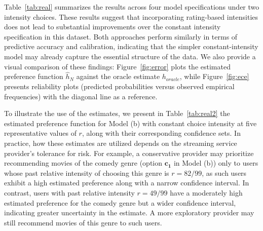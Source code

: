 \documentclass[12pt]{amsart}
\theoremstyle{plain}
\theoremstyle{remark}
\numberwithin{equation}{section}
\begin{document}
Table~\ref{tab:real} summarizes the results across four model specifications under two intensity choices. These results suggest that incorporating rating-based intensities does not lead to substantial improvements over the constant intensity specification in this dataset. Both approaches perform similarly in terms of predictive accuracy and calibration, indicating that the simpler constant-intensity model may already capture the essential structure of the data. We also provide a visual comparison of these findings: Figure~\ref{fig:error} plots the estimated preference function $\hat{h}_N$ against the oracle estimate $h_{oracle}$, while Figure~\ref{fig:ece} presents reliability plots (predicted probabilities versus observed empirical frequencies) with the diagonal line as a reference.

To illustrate the use of the estimates, we present in Table~\ref{tab:real2} the estimated preference function for Model (b) with constant choice intensity at five representative values of $r$, along with their corresponding confidence sets. In practice, how these estimates are utilized depends on the streaming service provider’s tolerance for risk. For example, a conservative provider may prioritize recommending movies of the comedy genre (option $\boldsymbol{c_1}$ in Model (b)) only to users whose past relative intensity of choosing this genre is $r = 82/99$, as such users exhibit a high estimated preference along with a narrow confidence interval. In contrast, users with past relative intensity $r = 49/99$ have a moderately high estimated preference for the comedy genre but a wider confidence interval, indicating greater uncertainty in the estimate. A more exploratory provider may still recommend movies of this genre to such users. 
\end{document}
